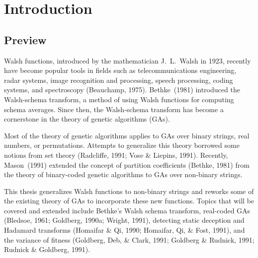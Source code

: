 \typeout{}
\chapter{Introduction}
\section{Preview}
Walsh functions, introduced by the mathematician J.~L.~Walsh in 1923, 
recently have become popular tools in fields such as 
telecommunications engineering, radar systems, image recognition and
processing, speech processing, coding systems, and spectroscopy
(Beauchamp, 1975).
Bethke~(1981) introduced the Walsh-schema transform, a method of using 
Walsh functions for
computing schema averages.  Since then, the Walsh-schema transform has become
a cornerstone in the theory of genetic algorithms (GAs).

Most of the theory of genetic algorithms applies to GAs over binary strings,
real numbers, or permutations.  
Attempts to generalize this theory borrowed some notions from set theory
(Radcliffe, 1991; Vose \& Liepins, 1991).
Recently, Mason~(1991) extended the concept of
partition coefficients (Bethke, 1981) from the theory of binary-coded
genetic algorithms to GAs over non-binary strings.

This thesis generalizes Walsh functions to non-binary strings and
reworks some of the existing theory of GAs to incorporate these new
functions.  Topics that will be covered and extended include Bethke's Walsh
schema transform, real-coded GAs (Bledsoe, 1961; Goldberg, 1990a;
Wright, 1991), detecting static deception and \linebreak Hadamard transforms 
(Homaifar \& Qi, 1990; Homaifar, Qi, \& Fost, 1991), and the variance of 
fitness (Goldberg, Deb, \& Clark, 1991; Goldberg \& Rudnick, 1991;
Rudnick \& Goldberg, 1991).

